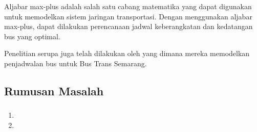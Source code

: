 \documentclass[aspectratio=169]{beamer}
\theoremstyle{definition}
\numberwithin{definisi}{subsection}
\begin{document}
    \begin{frame}
        \frametitle{\insertsubsection}
        \begin{figure}
            \centering
        \end{figure}
    \end{frame}

    \begin{frame}
        Aljabar max-plus adalah salah satu cabang matematika yang dapat digunakan untuk memodelkan sistem jaringan transportasi. Dengan menggunakan aljabar max-plus, dapat dilakukan perencanaan jadwal keberangkatan dan kedatangan bus yang optimal.

        Penelitian serupa juga telah dilakukan oleh \citeauthor{AfwanGiri2023PemodelanMaxPlus} yang dimana mereka memodelkan penjadwalan bus untuk Bus Trans Semarang.
    \end{frame}

    \subsection{Rumusan Masalah}
    \begin{frame}
        \frametitle{\insertsubsection}
        \begin{enumerate}
            \item {}
            \item {}
        \end{enumerate}
    \end{frame}
\end{document}
